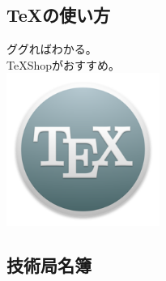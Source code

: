 \documentclass[dvipdfmx,jb5]{jarticle}
\begin{document}
\subsection{\TeX の使い方}
 ググればわかる。\\
 \TeX Shopがおすすめ。\\
 \includegraphics[width=5cm]{assets/TeX.png}\\
\subsection{技術局名簿}
\end{document}
